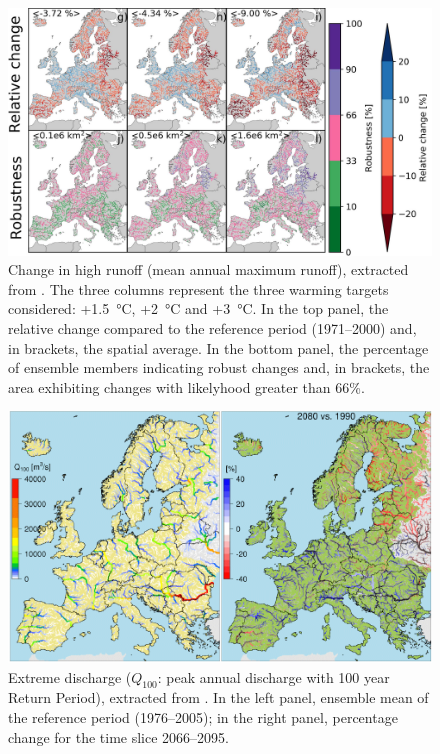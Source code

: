 \begin{figure}
    \centering
    \includegraphics[width=\textwidth]{figures/ita_flood/thober}
    \decoRule
    \caption[High runoff change in Europe according to \citet{Thober2018}]{
        Change in high runoff (mean annual maximum runoff), extracted from \citet[][figure  1]{Thober2018}. The three columns represent the three warming targets considered: +\SI{1.5}{\celsius}, +\SI{2}{\celsius} and  +\SI{3}{\celsius}. In the top panel, the relative change compared to the reference period (1971--2000) and, in brackets, the spatial average. In the bottom panel, the percentage of ensemble members indicating robust changes and, in brackets, the area exhibiting changes with likelyhood greater than 66\%.
    }
    \label{fig:thober_change}
\end{figure}

\begin{figure}
    \centering
    \includegraphics[width=\textwidth]{figures/ita_flood/alfieri2015_crop}
    \decoRule
    \caption[Extreme discharge change in Europe according to \citet{Alfieri2015a}]{
        Extreme discharge ($Q_{100}$: peak annual discharge with 100 year Return Period), extracted from \citet[][figure  6]{Alfieri2015a}. In the left panel, ensemble mean of the reference period (1976--2005); in the right panel, percentage change for the time slice  2066--2095.
    }
    \label{fig:alfieri_change}
\end{figure}

